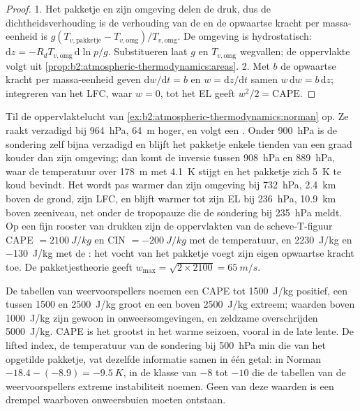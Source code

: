 \begin{proof}
1. Het pakketje en zijn omgeving delen de druk, dus de dichtheidsverhouding is de verhouding van de
 en de opwaartse kracht per massa-eenheid is
$g(T_{v,\text{pakketje}} - T_{v,\text{omg}})/T_{v,\text{omg}}$. De omgeving is hydrostatisch:
$\mathrm{d}z = -R_dT_{v,\text{omg}}\,\mathrm{d}\ln p/g$. Substitueren laat $g$ en
$T_{v,\text{omg}}$ wegvallen; de oppervlakte volgt uit \cref{prop:b2:atmospheric-thermodynamics:areas}.
2. Met $b$ de opwaartse kracht per massa-eenheid geven $\mathrm{d}w/\mathrm{d}t = b$ en $w = \mathrm{d}z/
\mathrm{d}t$ samen $w\,\mathrm{d}w = b\,\mathrm{d}z$; integreren van het LFC, waar $w = 0$, tot
het EL geeft $w^2/2 = \text{CAPE}$.
\end{proof}

\begin{example}\label{ex:b2:atmospheric-thermodynamics:cape}
Til de oppervlaktelucht van \cref{ex:b2:atmospheric-thermodynamics:norman} op. Ze raakt verzadigd bij
\qty{964}{hPa}, \qty{64}{m} hoger, en volgt een . Onder \qty{900}{hPa} is de sondering
zelf bijna verzadigd en blijft het pakketje enkele tienden van een graad kouder dan zijn
omgeving; dan komt de inversie tussen \qty{908}{hPa} en \qty{889}{hPa}, waar de
temperatuur over \qty{178}{m} met \qty{4.1}{K} stijgt en het pakketje zich \qty{5}{K} te
koud bevindt. Het wordt pas warmer dan zijn omgeving bij \qty{732}{hPa}, \qty{2.4}{km} boven de
grond, zijn LFC, en blijft warmer tot zijn EL bij \qty{236}{hPa}, \qty{10.9}{km} boven zeeniveau,
net onder de tropopauze die de sondering bij \qty{235}{hPa} meldt. Op een fijn rooster van drukken zijn de
oppervlakten van de scheve-T-figuur CAPE $= \qty{2100}{J/kg}$ en CIN $= \qty{-200}{J/kg}$ met de
temperatuur, en \qty{2230}{J/kg} en \qty{-130}{J/kg} met de : het vocht
van het pakketje voegt zijn eigen opwaartse kracht toe. De pakketjestheorie geeft $w_{\max} = \sqrt{2 \times 2100} =
\qty{65}{m/s}$.
\end{example}

De tabellen van weervoorspellers noemen een CAPE tot \qty{1500}{J/kg} positief, een tussen 1500 en
\qty{2500}{J/kg} groot en een boven \qty{2500}{J/kg} extreem; waarden boven \qty{1000}{J/kg} zijn gewoon in onweersomgevingen,
en zeldzame overschrijden \qty{5000}{J/kg}. CAPE is het grootst in het warme seizoen, vooral in de late
lente. De lifted index, de temperatuur van de sondering bij \qty{500}{hPa} min die van het opgetilde
pakketje, vat dezelfde informatie samen in één getal: in Norman $-18.4 - (-8.9) = \qty{-9.5}{K}$,
in de klasse van $-8$ tot $-10$ die de tabellen van de weervoorspellers extreme instabiliteit noemen. Geen van
deze waarden is een drempel waarboven onweersbuien moeten ontstaan.

